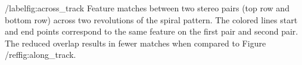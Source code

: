 /label{fig:across_track} Feature matches between two stereo pairs (top row and bottom row) across two revolutions of the spiral pattern. The colored lines start and end points correspond to the same feature on the first pair and second pair. The reduced overlap results in fewer matches when compared to Figure /ref{fig:along_track}.
  
  